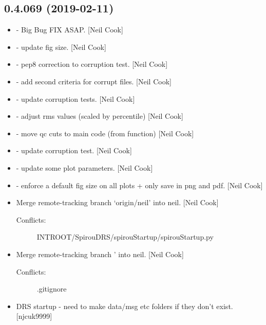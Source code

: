 \documentclass[a4paper,10pt,english]{report}
\begin{document}
\subsection{0.4.069 (2019-02-11)}
\label{\detokenize{misc/changelog:id189}}\begin{itemize}
\item {} 
 - Big Bug FIX ASAP. {[}Neil Cook{]}

\item {} 
 - update  fig size. {[}Neil
Cook{]}

\item {} 
 - pep8 correction to corruption test. {[}Neil Cook{]}

\item {} 
 - add second criteria for corrupt files.
{[}Neil Cook{]}

\item {} 
 - update corruption tests. {[}Neil Cook{]}

\item {} 
 - adjust rms values (scaled by percentile) {[}Neil Cook{]}

\item {} 
 - move qc cuts to main code (from function)
{[}Neil Cook{]}

\item {} 
 - update corruption test. {[}Neil Cook{]}

\item {} 
 - update some plot parameters. {[}Neil Cook{]}

\item {} 
 - enforce a default fig size on all plots + only save in
png and pdf. {[}Neil Cook{]}

\item {} 
Merge remote-tracking branch ‘origin/neil’ into neil. {[}Neil Cook{]}
\begin{description}
\item[{Conflicts:}] \leavevmode
INTROOT/SpirouDRS/spirouStartup/spirouStartup.py

\end{description}

\item {} 
Merge remote-tracking branch ’ into neil. {[}Neil
Cook{]}
\begin{description}
\item[{Conflicts:}] \leavevmode
.gitignore

\end{description}

\item {} 
DRS startup - need to make data/msg etc folders if they don’t exist.
{[}njcuk9999{]}

\end{itemize}
\end{document}
